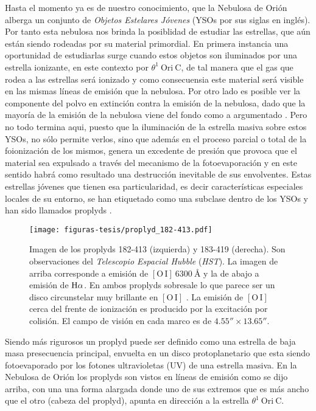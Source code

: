 Hasta el momento ya es de nuestro conocimiento, que la Nebulosa de Orión alberga un conjunto de \textit{Objetos Estelares Jóvenes} (YSOs por sus siglas en inglés). Por tanto esta nebulosa nos brinda la posiblidad de estudiar las estrellas, que aún están siendo rodeadas por su material primordial. En primera instancia una oportunidad de estudiarlas surge cuando estos objetos son iluminados por una estrella ionizante, en este contexto  por \(\theta^1\ \text{Ori}\ \text{C}\), de tal manera que el gas que rodea a las estrellas será ionizado y como consecuensia este material será visible en las mismas líneas de emisión que la nebulosa. Por otro lado es posible ver la componente del polvo en extinción contra la emisión de la nebulosa, dado que la mayoría de la emisión de la nebulosa viene del fondo como a argumentado \citet{Odell:2008}. Pero no todo termina aqui, puesto que la iluminación de la estrella masiva sobre estos YSOs, no sólo permite verlos, sino que además en el proceso parcial o total de la foionización de los mismos, genera un excedente de presión que provoca que el material sea expulsado a través del mecanismo de la fotoevaporación y en este sentido habrá como resultado una destrucción inevitable de sus envolventes. Estas estrellas jóvenes que tienen esa particularidad, es decir características especiales locales de su entorno, se han etiquetado como una subclase dentro de los YSOs y han sido llamados proplyds \citep{Odell:1994}.\\

\begin{figure}
  \centering
  \texttt{[image: figuras-tesis/proplyd\_182-413.pdf]}
  \caption{Imagen de los proplyds 182-413 (izquierda) y 183-419 (derecha). Son observaciones del \textit{Telescopio Espacial Hubble} (\textit{HST}). La imagen de arriba corresponde a emisión de \(\mathrm{[O\,I]}~6300~\text{\AA{}}\)  y la de abajo a emisión de \(\mathrm{H}\alpha\). En ambos proplyds sobresale lo que parece ser un disco circunstelar muy brillante en  \(\mathrm{[O\,I]}\) \citep{Bally:2000a}. La emisión de \(\mathrm{[O\,I]}\) cerca del frente de ionización es producido por la excitación por colisión. El campo de visión en cada marco es de \(4.55'' \times 13.65''\).}
  \label{fig:182-413}
\end{figure}
  

Siendo más rigurosos un proplyd puede ser definido como una estrella de baja masa presecuencia principal, envuelta en un  disco protoplanetario que esta siendo fotoevaporado por los fotones ultravioletas (UV) de una estrella masiva. En la Nebulosa de Orión los proplyds son vistos en líneas de emisión como se dijo arriba, con una una forma alargada donde uno de sus extremos que es más ancho que el otro (cabeza del proplyd), apunta en dirección a la estrella  \(\theta^1\ \text{Ori}\ \text{C}\). 

